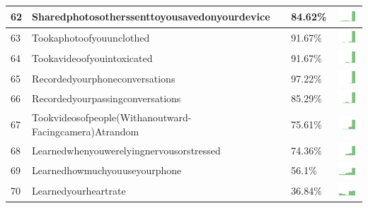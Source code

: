 \begin{table}[t]
\begin{center}
\begin{tabular}{| p{0.5cm} | p{7cm} | p{1cm} | c |}
62 & Sharedphotosotherssenttoyousavedonyourdevice & 84.62\% & \includegraphics[width = 2cm, height = 0.5cm]{../sharedphotosotherssenttoyousavedonyourdevicePUBLIC} \\ \hline 
63 & Tookaphotoofyouunclothed & 91.67\% & \includegraphics[width = 2cm, height = 0.5cm]{../tookaphotoofyouunclothedPUBLIC} \\ \hline 
64 & Tookavideoofyouintoxicated & 91.67\% & \includegraphics[width = 2cm, height = 0.5cm]{../tookavideoofyouintoxicatedPUBLIC} \\ \hline 
65 & Recordedyourphoneconversations & 97.22\% & \includegraphics[width = 2cm, height = 0.5cm]{../recordedyourphoneconversationsPUBLIC} \\ \hline 
66 & Recordedyourpassingconversations & 85.29\% & \includegraphics[width = 2cm, height = 0.5cm]{../recordedyourpassingconversationsPUBLIC} \\ \hline 
67 & Tookvideosofpeople(Withanoutward-Facingcamera)Atrandom & 75.61\% & \includegraphics[width = 2cm, height = 0.5cm]{../tookvideosofpeople(withanoutward-facingcamera)atrandomPUBLIC} \\ \hline 
68 & Learnedwhenyouwerelyingnervousorstressed & 74.36\% & \includegraphics[width = 2cm, height = 0.5cm]{../learnedwhenyouwerelyingnervousorstressedPUBLIC} \\ \hline 
69 & Learnedhowmuchyouuseyourphone & 56.1\% & \includegraphics[width = 2cm, height = 0.5cm]{../learnedhowmuchyouuseyourphonePUBLIC} \\ \hline 
70 & Learnedyourheartrate & 36.84\% & \includegraphics[width = 2cm, height = 0.5cm]{../learnedyourheartratePUBLIC} \\ \hline 

\end{tabular}
\end{center}
\end{table}
